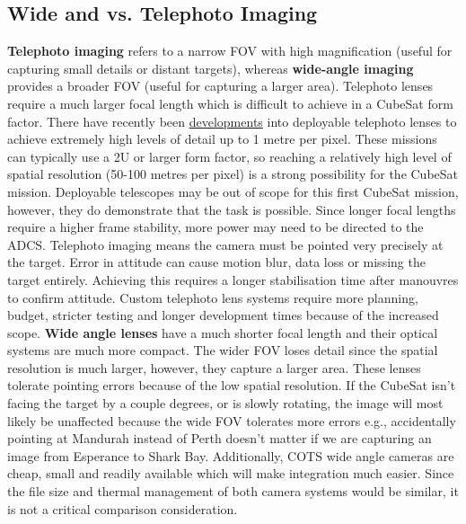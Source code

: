 \subsection{Wide and vs. Telephoto Imaging}
\textbf{Telephoto imaging} refers to a narrow FOV with high magnification (useful for capturing small details or distant targets), whereas \textbf{wide-angle imaging} provides a broader FOV (useful for capturing a larger area).
\nl
Telephoto lenses require a much larger focal length which is difficult to achieve in a CubeSat form factor. There have recently been \href{https://digitalcommons.usu.edu/cgi/viewcontent.cgi?referer=&httpsredir=1&article=3059&context=smallsat}{developments} into deployable telephoto lenses to achieve extremely high levels of detail up to 1 metre per pixel. These missions can typically use a 2U or larger form factor, so reaching a relatively high level of spatial resolution (50-100 metres per pixel) is a strong possibility for the CubeSat mission. Deployable telescopes may be out of scope for this first CubeSat mission, however, they do demonstrate that the task is possible.
Since longer focal lengths require a higher frame stability, more power may need to be directed to the ADCS. Telephoto imaging means the camera must be pointed very precisely at the target. Error in attitude can cause motion blur, data loss or missing the target entirely. Achieving this requires a longer stabilisation time after manouvres to confirm attitude.
Custom telephoto lens systems require more planning, budget, stricter testing and longer development times because of the increased scope.
\nl
\textbf{Wide angle lenses} have a much shorter focal length and their optical systems are much more compact. The wider FOV loses detail since the spatial resolution is much larger, however, they capture a larger area.
These lenses tolerate pointing errors because of the low spatial resolution. If the CubeSat isn't facing the target by a couple degrees, or is slowly rotating, the image will most likely be unaffected because the wide FOV tolerates more errors e.g., accidentally pointing at Mandurah instead of Perth doesn't matter if we are capturing an image from Esperance to Shark Bay.
Additionally, COTS wide angle cameras are cheap, small and readily available which will make integration much easier.
\nl
Since the file size and thermal management of both camera systems would be similar, it is not a critical comparison consideration.

